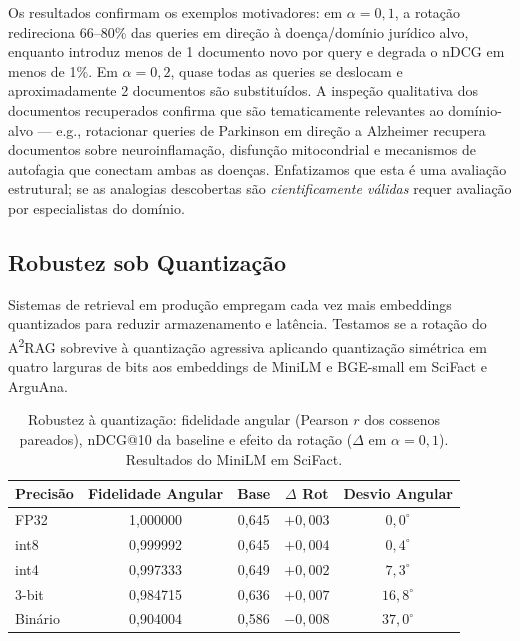 \documentclass{article}
\begin{document}
Os resultados confirmam os exemplos motivadores: em $\alpha = 0{,}1$, a rotação redireciona 66--80\% das queries em direção à doença/domínio jurídico alvo, enquanto introduz menos de 1 documento novo por query e degrada o nDCG em menos de 1\%. Em $\alpha = 0{,}2$, quase todas as queries se deslocam e aproximadamente 2 documentos são substituídos. A inspeção qualitativa dos documentos recuperados confirma que são tematicamente relevantes ao domínio-alvo --- e.g., rotacionar queries de Parkinson em direção a Alzheimer recupera documentos sobre neuroinflamação, disfunção mitocondrial e mecanismos de autofagia que conectam ambas as doenças. Enfatizamos que esta é uma avaliação estrutural; se as analogias descobertas são \emph{cientificamente válidas} requer avaliação por especialistas do domínio.

\subsection{Robustez sob Quantização}

Sistemas de retrieval em produção empregam cada vez mais embeddings quantizados para reduzir armazenamento e latência. Testamos se a rotação do A\textsuperscript{2}RAG sobrevive à quantização agressiva aplicando quantização simétrica em quatro larguras de bits aos embeddings de MiniLM e BGE-small em SciFact e ArguAna.

\begin{table}[ht]
\centering
\caption{Robustez à quantização: fidelidade angular (Pearson $r$ dos cossenos pareados), nDCG@10 da baseline e efeito da rotação ($\Delta$ em $\alpha = 0{,}1$). Resultados do MiniLM em SciFact.}
\label{tab:quantization}
\small
\begin{tabular}{lcccc}
\toprule
Precisão & Fidelidade Angular & Base & $\Delta$ Rot & Desvio Angular \\
\midrule
FP32 & 1,000000 & 0,645 & $+0{,}003$ & $0{,}0^{\circ}$ \\
int8 & 0,999992 & 0,645 & $+0{,}004$ & $0{,}4^{\circ}$ \\
int4 & 0,997333 & 0,649 & $+0{,}002$ & $7{,}3^{\circ}$ \\
3-bit & 0,984715 & 0,636 & $+0{,}007$ & $16{,}8^{\circ}$ \\
Binário & 0,904004 & 0,586 & $-0{,}008$ & $37{,}0^{\circ}$ \\
\bottomrule
\end{tabular}
\end{table}
\end{document}
